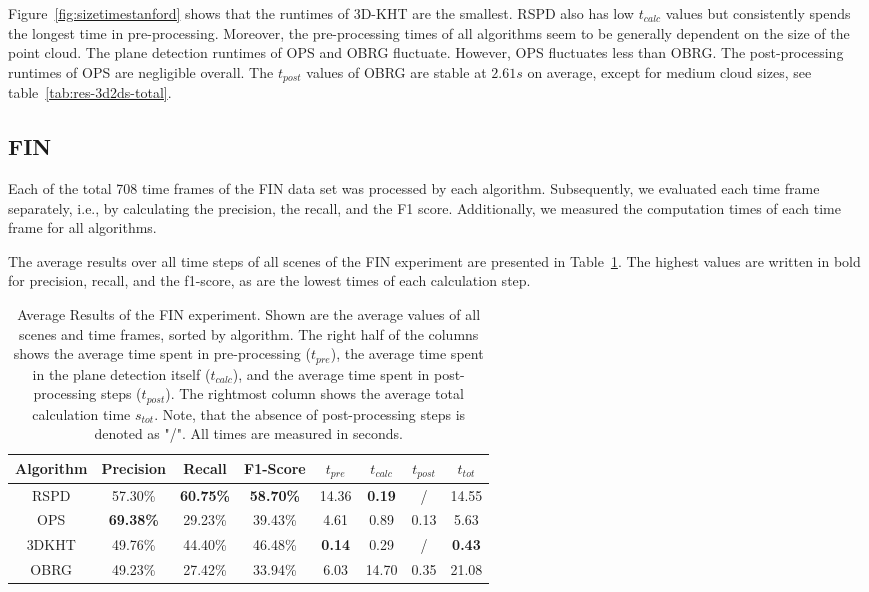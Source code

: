 \documentclass[main.tex]{subfiles}
\begin{document}
Figure~\ref{fig:sizetimestanford} shows that the runtimes of 3D-KHT are the smallest. RSPD also has low $t_{calc}$ values
but consistently spends the longest time in pre-processing.
Moreover, the pre-processing times of all algorithms seem to be generally dependent on the size of the point cloud.
The plane detection runtimes of OPS and OBRG fluctuate. However, OPS fluctuates less than OBRG.
The post-processing runtimes of OPS are negligible overall. The $t_{post}$ values of OBRG are stable at $2.61s$ on average,
except for medium cloud sizes, see table~\ref{tab:res-3d2ds-total}.

\subsection{FIN}
Each of the total 708 time frames of the FIN data set was processed by each algorithm.
Subsequently, we evaluated each time frame separately, i.e., by calculating the precision, the recall, and the F1 score.
Additionally, we measured the computation times of each time frame for all algorithms.

The average results over all time steps of all scenes of the FIN experiment are presented in Table~\ref{tab:res-fin-total}.
The highest values are written in bold for precision, recall, and the f1-score, as are the lowest times of each calculation step.


\begin{table}[H]
    \centering
    \begin{tabular}{c|cccccc|c}
        Algorithm & Precision        & Recall           & F1-Score         & $t_{pre}$     & $t_{calc}$    & $t_{post}$ & $t_{tot}$     \\ \hline
        RSPD      & 57.30\%          & \textbf{60.75\%} & \textbf{58.70\%} & 14.36         & \textbf{0.19} & /          & 14.55         \\
        OPS       & \textbf{69.38\%} & 29.23\%          & 39.43\%          & 4.61          & 0.89          & 0.13       & 5.63          \\
        3DKHT     & 49.76\%          & 44.40\%          & 46.48\%          & \textbf{0.14} & 0.29          & /          & \textbf{0.43} \\
        OBRG      & 49.23\%          & 27.42\%          & 33.94\%          & 6.03          & 14.70         & 0.35       & 21.08
    \end{tabular}
    \caption[Average FIN Results]{Average Results of the FIN experiment. Shown are the average values of all scenes and time frames, sorted by
        algorithm. The right half of the columns shows the average time spent in pre-processing ($t_{pre}$), the average time spent in the plane
        detection itself ($t_{calc}$), and the average time spent in post-processing steps ($t_{post}$).
        The rightmost column shows the average total calculation time $s_{tot}$.
        Note, that the absence of post-processing steps is denoted as "/".
        All times are measured in seconds.}
    \label{tab:res-fin-total}
\end{table}
\end{document}
